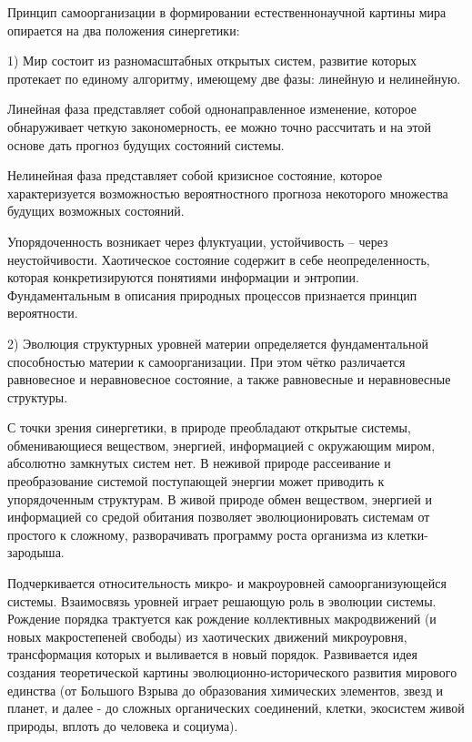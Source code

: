 \documentclass[exam_answers.tex]{subfiles}
\begin{document}
\renewcommand{\baselinestretch}{\blch}

Принцип самоорганизации в формировании естественнонаучной картины
мира опирается на два положения синергетики:

1) Мир состоит из разномасштабных открытых систем, развитие которых
протекает по единому алгоритму, имеющему две фазы: линейную и
нелинейную.

Линейная фаза представляет собой однонаправленное изменение, которое
обнаруживает четкую закономерность, ее можно точно рассчитать и на этой
основе дать прогноз будущих состояний системы.

Нелинейная фаза представляет собой кризисное состояние, которое
характеризуется возможностью вероятностного прогноза некоторого
множества будущих возможных состояний.

Упорядоченность возникает через флуктуации, устойчивость – через
неустойчивости. Хаотическое состояние содержит в себе неопределенность,
которая конкретизируются понятиями информации и энтропии.
Фундаментальным в описания природных процессов признается принцип
вероятности.

2) Эволюция структурных уровней материи определяется
фундаментальной способностью материи к самоорганизации. При этом чётко
различается равновесное и неравновесное состояние, а также равновесные и
неравновесные структуры.

С точки зрения синергетики, в природе преобладают открытые системы,
обменивающиеся веществом, энергией, информацией с окружающим миром,
абсолютно замкнутых систем нет. В неживой природе рассеивание и
преобразование системой поступающей энергии может приводить к
упорядоченным структурам. В живой природе обмен веществом, энергией и
информацией со средой обитания позволяет эволюционировать системам от
простого к сложному, разворачивать программу роста организма из клетки-зародыша.

Подчеркивается относительность микро- и макроуровней
самоорганизующейся системы. Взаимосвязь уровней играет решающую роль в
эволюции системы. Рождение порядка трактуется как рождение коллективных
макродвижений (и новых макростепеней свободы) из хаотических движений 
микроуровня, трансформация которых и выливается в новый порядок.
Развивается идея создания теоретической картины эволюционно-исторического
развития мирового единства (от Большого Взрыва до образования химических
элементов, звезд и планет, и далее - до сложных органических соединений,
клетки, экосистем живой природы, вплоть до человека и социума).
\end{document}

